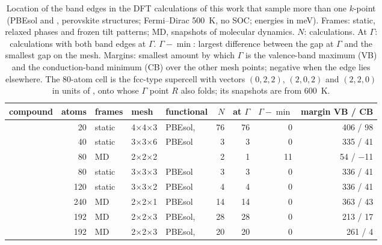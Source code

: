 \begin{table}[htbp]
\centering\footnotesize
\caption{Location of the band edges in the DFT calculations of this work that sample more than one $k$-point (PBEsol and \rSCAN{}, perovskite structures; Fermi--Dirac \SI{500}{K}, no SOC; energies in meV). Frames: static, relaxed phases and frozen tilt patterns; MD, snapshots of molecular dynamics. $N$: calculations. At $\Gamma$: calculations with both band edges at $\Gamma$. $\Gamma-\min$: largest difference between the gap at $\Gamma$ and the smallest gap on the mesh. Margins: smallest amount by which $\Gamma$ is the valence-band maximum (VB) and the conduction-band minimum (CB) over the other mesh points; negative when the edge lies elsewhere. The 80-atom cell is the fcc-type supercell with vectors $(0,2,2)$, $(2,0,2)$ and $(2,2,0)$ in units of \apc{}, onto whose $\Gamma$ point $R$ also folds; its snapshots are from \SI{600}{K}.}
\label{tab:si-gap-kpoints}
\begin{tabular}{lrlllrrrr}
\toprule compound & atoms & frames & mesh & functional & $N$ & at $\Gamma$ & $\Gamma-\min$ & margin VB / CB \\ \midrule
\CsSnI{} & 20 & static & 4$\times$4$\times$3 & PBEsol, \rSCAN{} & 76 & 76 & 0 & 406 / 98 \\
\CsSnI{} & 40 & static & 3$\times$3$\times$6 & PBEsol & 3 & 3 & 0 & 335 / 41 \\
\CsSnI{} & 80 & MD & 2$\times$2$\times$2 & \rSCAN{} & 2 & 1 & 11 & 54 / $-$11 \\
\CsSnI{} & 80 & static & 3$\times$3$\times$3 & PBEsol & 3 & 3 & 0 & 336 / 41 \\
\CsSnI{} & 120 & static & 3$\times$3$\times$2 & PBEsol & 4 & 4 & 0 & 336 / 41 \\
\CsSnI{} & 240 & MD & 2$\times$2$\times$1 & PBEsol & 14 & 14 & 0 & 363 / 43 \\
\MASnI{} & 192 & MD & 2$\times$2$\times$3 & PBEsol, \rSCAN{} & 28 & 28 & 0 & 213 / 17 \\
\FASnI{} & 192 & MD & 2$\times$2$\times$3 & PBEsol, \rSCAN{} & 20 & 20 & 0 & 261 / 4 \\
\bottomrule
\end{tabular}
\end{table}
